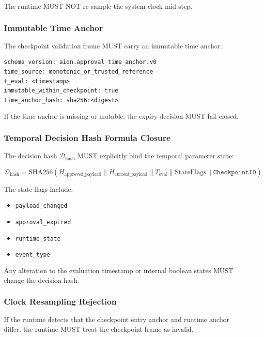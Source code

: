 The runtime MUST NOT re-sample the system clock mid-step.

\subsubsection{Immutable Time Anchor}

The checkpoint validation frame MUST carry an immutable time anchor:

\begin{verbatim}
schema_version: aion.approval_time_anchor.v0
time_source: monotonic_or_trusted_reference
t_eval: <timestamp>
immutable_within_checkpoint: true
time_anchor_hash: sha256:<digest>
\end{verbatim}

If the time anchor is missing or mutable, the expiry decision MUST fail closed.

\subsubsection{Temporal Decision Hash Formula Closure}

The decision hash $\mathcal{D}_{\mathrm{hash}}$ MUST explicitly bind the temporal parameter state:

\begin{equation}
\mathcal{D}_{\mathrm{hash}}
=
\mathrm{SHA256}
(
H_{\mathrm{approved\_payload}}
\parallel
H_{\mathrm{current\_payload}}
\parallel
T_{\mathrm{eval}}
\parallel
\mathrm{StateFlags}
\parallel
\mathtt{CheckpointID}
)
\end{equation}

The state flags include:

\begin{itemize}
  \item \texttt{payload\_changed}
  \item \texttt{approval\_expired}
  \item \texttt{runtime\_state}
  \item \texttt{event\_type}
\end{itemize}

Any alteration to the evaluation timestamp or internal boolean states MUST change the decision hash.

\subsubsection{Clock Resampling Rejection}

If the runtime detects that the checkpoint entry anchor and runtime anchor differ, the runtime MUST treat the checkpoint frame as invalid.

